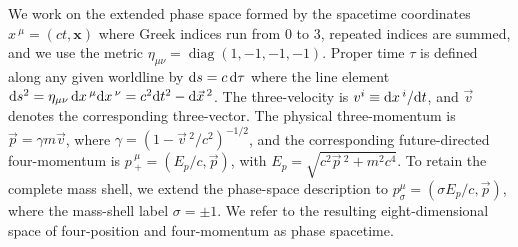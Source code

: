 \documentclass[final,5p,times,twocolumn]{elsarticle}
\begin{document}
We work on the extended phase space formed by the spacetime coordinates
$  
    x\,^\mu=(ct,\bm{x})
$ where Greek indices run from $0$ to $3$, repeated indices are summed, and we use the metric $\eta_{\mu\nu}=\operatorname{diag}(1,-1,-1,-1)$. 
Proper time $\tau$ is defined along any given worldline by $\mathrm{d} s = c\,\mathrm{d}\tau $ where the line element $\mathrm{d} s^2 = \eta_{\mu\nu} \, \mathrm{d} x\,^\mu \mathrm{d} x\,^\nu = c^2 \mathrm{d} t^2 - \mathrm{d}\Vec{x}\,^2
$. 
The three-velocity is $v^i \equiv \mathrm{d} x\,^i/\mathrm{d} t$, and $\Vec{v}$ denotes the corresponding three-vector. 
The physical three-momentum is $\Vec{p}=\gamma m\Vec{v}$, where
$\gamma=(1-\Vec{v}\,^2/c^2)^{-1/2}$, and the corresponding
future-directed four-momentum is $p\,^\mu_+=(E_p/c,\Vec{p})$, with
$E_p=\sqrt{c^2\Vec{p}\,^2+m^2c^4}$. To retain the complete mass shell,
we extend the phase-space description to
$p^\mu_\sigma=(\sigma E_p/c,\Vec{p})$, where the mass-shell label $\sigma=\pm1$. We refer to the
resulting eight-dimensional space of four-position and four-momentum as phase spacetime.
\end{document}
